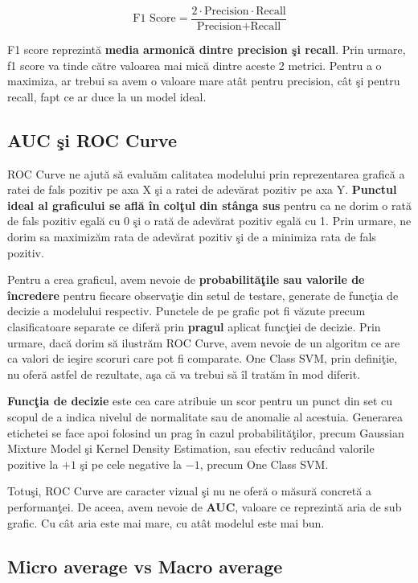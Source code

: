 \begin{equation}
    \text{F1 Score} = \frac{2 \cdot \text{Precision} \cdot \text{Recall}}{\text{Precision} + \text{Recall}}
\end{equation}

F1 score reprezintă \textbf{media armonică dintre precision şi recall}. Prin urmare, f1 score 
va tinde către valoarea mai mică dintre aceste 2 metrici. Pentru a o maximiza,
ar trebui sa avem o valoare mare atât pentru precision, cât şi pentru recall,
fapt ce ar duce la un model ideal.

\subsection{AUC şi ROC Curve}

ROC Curve ne ajută să evaluăm calitatea modelului prin reprezentarea grafică 
a ratei de fals pozitiv pe axa X şi a ratei de adevărat pozitiv pe axa Y. 
\textbf{Punctul 
ideal al graficului se află în colţul din stânga sus} pentru ca ne dorim o 
rată de fals pozitiv egală cu 0 şi o rată de adevărat pozitiv egală cu 1. Prin urmare,
ne dorim sa maximizăm rata de adevărat pozitiv şi de a minimiza rata de fals pozitiv.

Pentru a crea graficul, avem nevoie de \textbf{probabilităţile sau valorile de încredere} 
pentru fiecare observaţie din setul de  testare, generate de funcţia de decizie a 
modelului respectiv. Punctele de pe grafic pot fi văzute precum clasificatoare 
separate ce diferă prin \textbf{pragul} aplicat funcţiei de decizie. Prin urmare, dacă
dorim să ilustrăm ROC Curve, avem nevoie de un algoritm ce are ca valori de ieşire
scoruri care pot fi comparate. One Class SVM, prin definiţie, nu oferă astfel de 
rezultate, aşa că va trebui să îl tratăm în mod diferit.

\textbf{Funcţia de decizie} este cea care atribuie un scor pentru 
un punct din set cu scopul de a indica nivelul de normalitate sau de anomalie 
al acestuia. Generarea etichetei se face apoi folosind un prag în cazul 
probabilităţilor, precum Gaussian Mixture Model şi Kernel Density Estimation, 
sau efectiv reducând valorile pozitive la $+1$ şi pe cele negative la $-1$,
precum One Class SVM.

Totuşi, ROC Curve are caracter vizual şi nu ne oferă o măsură concretă a performanţei.
De aceea, avem nevoie de \textbf{AUC}, valoare ce reprezintă aria de sub grafic. Cu cât aria
este mai mare, cu atât modelul este mai bun.

\subsection{Micro average vs Macro average}


